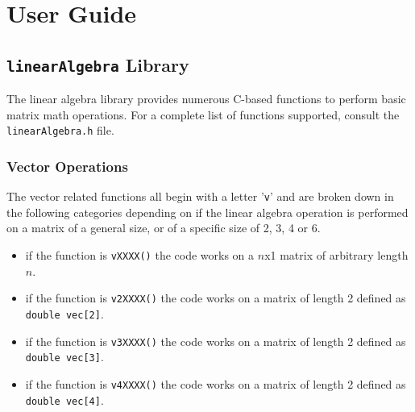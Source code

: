 
\section{User Guide}

\subsection{{\tt linearAlgebra} Library}
The linear algebra library provides numerous C-based functions to perform basic matrix math operations.  For a complete list of functions supported, consult the {\tt linearAlgebra.h} file. 

\subsubsection{Vector Operations}
The vector related functions all begin with a letter '{\tt v}' and are broken down in the following categories depending on if the linear algebra operation is performed on a matrix of a general size, or of a specific size of 2, 3, 4 or 6.
\begin{itemize}
	\item if the function is  {\tt vXXXX()} the code works on a $n$x1 matrix of arbitrary length $n$.  
	\item if the function is {\tt v2XXXX()}  the code works on a matrix of length 2 defined as {\tt double vec[2]}.
	\item if the function is {\tt v3XXXX()}  the code works on a matrix of length 2 defined as {\tt double vec[3]}.
	\item if the function is {\tt v4XXXX()} the code works on a matrix of length 2 defined as {\tt double vec[4]}.
\end{itemize}

